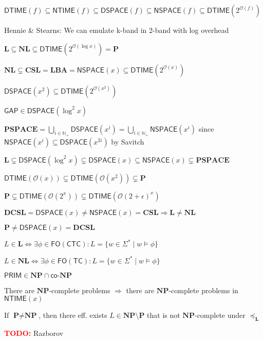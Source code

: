 \documentclass[10pt, twocolumn, parskip=never]{scrartcl}
\newcommand{\todo}[1]{\textcolor{red}{\textbf{TODO:}} #1}
\newcommand{\fat}[1]{\textbf{#1}}
\newcommand{\DTIME}[1]{\textsf{DTIME}(#1)}
\newcommand{\NTIME}[1]{\textsf{NTIME}(#1)}
\newcommand{\DSPACE}[1]{\textsf{DSPACE}(#1)}
\newcommand{\NSPACE}[1]{\textsf{NSPACE}(#1)}
\newcommand{\prob}[1]{\textsf{#1}}
\newcommand{\bigO}[1]{\mathcal{O}(#1)}
\newcommand{\reduce}{\preceq}
\newcommand{\lreduce}{\reduce_{\fat{L}}}
\begin{document}
\vfill

$\DTIME{f} \subseteq \NTIME{f} \subseteq \DSPACE{f} \subseteq \NSPACE{f} \subseteq \DTIME{2^{\bigO{f}}}$

Hennie \& Stearns: We can emulate k-band in 2-band with log overhead

$\fat{L} \subseteq \fat{NL} \subseteq \DTIME{2^{\mathcal{O}(\log{x})}} = \fat{P}$

$\fat{NL} \subsetneq \fat{CSL} = \fat{LBA} = \NSPACE{x} \subseteq \DTIME{2^{\mathcal{O}(x)}}$

$\DSPACE{x^2} \subseteq \DTIME{2^{\mathcal{O}(x^2)}}$

$\prob{GAP} \in \DSPACE{\log^2{x}}$

$\fat{PSPACE} = \bigcup_{i \in \mathbb{N}_+}{\DSPACE{x^i}} = \bigcup_{i \in \mathbb{N}_+}{\NSPACE{x^i}}$ since $\NSPACE{x^i} \subseteq \DSPACE{x^{2i}}$ by Savitch

$\fat{L} \subsetneq \DSPACE{\log^2{x}} \subsetneq \DSPACE{x} \subseteq \NSPACE{x} \subsetneq \fat{PSPACE}$

$\DTIME{\mathcal{O}(x)} \subsetneq \DTIME{\mathcal{O}(x^2)} \subsetneq \fat{P}$

$\fat{P} \subsetneq \DTIME{\mathcal{O}(2^x)} \subsetneq \DTIME{\mathcal{O}(2 + \epsilon)^x}$

$\fat{DCSL} = \DSPACE{x} \neq \NSPACE{x} = \fat{CSL} \Rightarrow \fat{L} \neq \fat{NL}$

$\fat{P} \neq \DSPACE{x} = \fat{DCSL}$

$L \in \fat{L} \Leftrightarrow \exists \phi \in \textsf{FO}(\textsf{CTC})\colon L = \{ w \in \Sigma^* \mid w \models \phi \}$

$L \in \fat{NL} \Leftrightarrow \exists \phi \in \textsf{FO}(\textsf{TC})\colon L = \{ w \in \Sigma^* \mid w \models \phi \}$

$\textsf{PRIM} \in \fat{NP} \cap \textsf{co-}\fat{NP}$

There are $\fat{NP}$-complete problems $\Rightarrow$ there are $\fat{NP}$-complete problems in $\NTIME{x}$

If $\fat{P} \neq \fat{NP}$, then there eff. exists $L \in \fat{NP} \setminus \fat{P}$ that is not $\fat{NP}$-complete under $\lreduce$

\vfill

\todo{Razborov}
\end{document}
